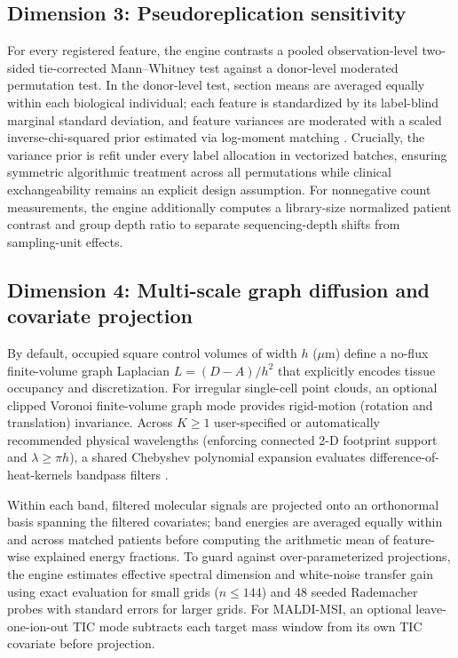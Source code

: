 \documentclass[11pt]{article}
\begin{document}
\subsection{Dimension 3: Pseudoreplication sensitivity}
For every registered feature, the engine contrasts a pooled observation-level two-sided tie-corrected Mann--Whitney test against a donor-level moderated permutation test. In the donor-level test, section means are averaged equally within each biological individual; each feature is standardized by its label-blind marginal standard deviation, and feature variances are moderated with a scaled inverse-chi-squared prior estimated via log-moment matching \cite{limma}. Crucially, the variance prior is refit under every label allocation in vectorized batches, ensuring symmetric algorithmic treatment across all permutations while clinical exchangeability remains an explicit design assumption. For nonnegative count measurements, the engine additionally computes a library-size normalized patient contrast and group depth ratio to separate sequencing-depth shifts from sampling-unit effects.

\subsection{Dimension 4: Multi-scale graph diffusion and covariate projection}
By default, occupied square control volumes of width $h$ ($\mu\mathrm{m}$) define a no-flux finite-volume graph Laplacian $L = (D - A)/h^2$ that explicitly encodes tissue occupancy and discretization. For irregular single-cell point clouds, an optional clipped Voronoi finite-volume graph mode provides rigid-motion (rotation and translation) invariance. Across $K \ge 1$ user-specified or automatically recommended physical wavelengths (enforcing connected 2-D footprint support and $\lambda \ge \pi h$), a shared Chebyshev polynomial expansion evaluates difference-of-heat-kernels bandpass filters \cite{wavelets}.

Within each band, filtered molecular signals are projected onto an orthonormal basis spanning the filtered covariates; band energies are averaged equally within and across matched patients before computing the arithmetic mean of feature-wise explained energy fractions. To guard against over-parameterized projections, the engine estimates effective spectral dimension and white-noise transfer gain using exact evaluation for small grids ($n \le 144$) and 48 seeded Rademacher probes with standard errors for larger grids. For MALDI-MSI, an optional leave-one-ion-out TIC mode subtracts each target mass window from its own TIC covariate before projection.
\end{document}

